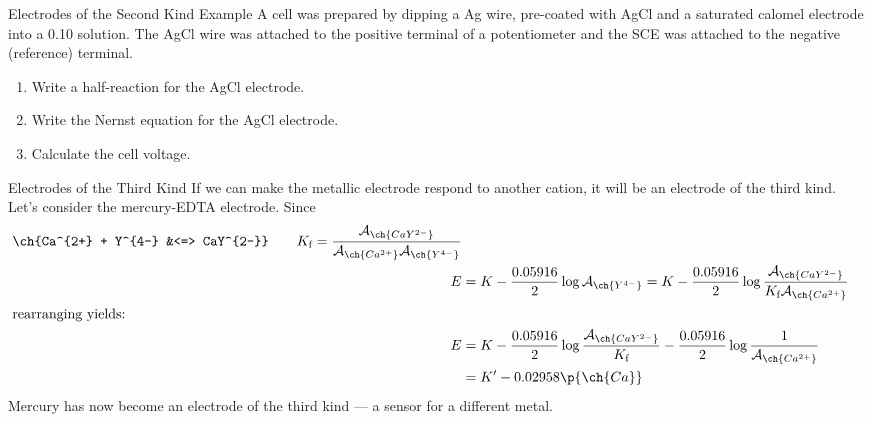 \documentclass[notes=only]{beamer}
\begin{document}
\begin{frame}[t]{Electrodes of the Second Kind Example}
	A cell was prepared by dipping a Ag wire, pre-coated with AgCl and a
	saturated calomel electrode into a \SI{0.10}{\Molar}  solution.
	The AgCl wire was attached to the positive terminal of a potentiometer
	and the SCE was attached to the negative (reference) terminal.
	\begin{enumerate}
		\item Write a half-reaction for the AgCl electrode.
		\item Write the Nernst equation for the AgCl electrode.
		\item Calculate the cell voltage.
			\visible<2->{\textbf{Activity?}}
	\end{enumerate}

\end{frame}

\clearpage
	
\begin{frame}{Electrodes of the Third Kind}
		If we can make the metallic electrode
			respond to another cation, it will be an
			electrode of the third kind. Let's
			consider the mercury-EDTA electrode.
			Since
			\begin{align*}
				\ch{Ca^{2+} + Y^{4-} &<=>
				CaY^{2-}} \qquad K_{\text{f}} =
				\frac{\mathcal{A}_{\ch{CaY^{2-}}}}
				{\mathcal{A}_{\ch{Ca^{2+}}}
				\mathcal{A}_{\ch{Y^{4-}}}} \\
				E &= K - \frac{0.05916}{2} \log
				\mathcal{A}_{\ch{Y^{4-}}}
				= K - \frac{0.05916}{2} \log
				\frac{\mathcal{A}_{\ch{CaY^{2-}}}}
				{K_{\text{f}}\mathcal{A}_{\ch{Ca^{2+}}}
				} \\
				\intertext{rearranging yields:}
				E &= K - \frac{0.05916}{2} \log \frac{\mathcal{A}_{\ch{CaY^{2-}}}}
				{K_{\text{f}}} -
				\frac{0.05916}{2} \log
				\frac{1}{\mathcal{A}_{\ch{Ca^{2+}}}}
				\\
				&= K' - 0.02958\p{\ch{Ca}}
			\end{align*}
			Mercury has now become an electrode of
			the third kind --- a sensor for a
			different metal.
\end{frame}
\end{document}
